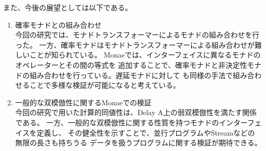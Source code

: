 \documentclass[japanese]{jssst_ppl}
\theoremstyle{definition}
\begin{document}
また、今後の展望としては以下である。
\begin{enumerate}
  \item 確率モナドとの組み合わせ\\
        今回の研究では、モナドトランスフォーマーによるモナドの組み合わせを行った。
        一方、確率モナドはモナドトランスフォーマーによる組み合わせが難しいことが知られている。%
        Monaeでは、インターフェイスに異なるモナドのオペレーターとその間の等式を
        追加することで、確率モナドと非決定性モナドの組み合わせを行っている。遅延モナドに対して
        も同様の手法で組み合わせることで多様な検証が可能になると考えている。
  \item 一般的な双模倣性に関するMonaeでの検証\\
        今回の研究で用いた計算的同値性は、Delay A上の弱双模倣性を満たす関係である。
        一方、一般的な双模倣性に関する性質を持つモナドのインターフェイスを定義し、
        その健全性を示すことで、並行プログラムやStreamなどの無限の長さも持ちうる
        データを扱うプログラムに関する検証が期待できる。
\end{enumerate}



\end{document}
